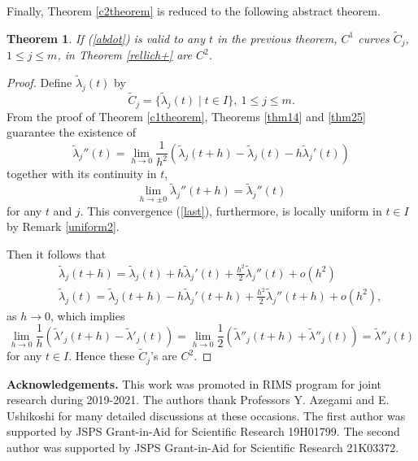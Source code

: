 \documentclass[final,a4paper]{jmsj}
\theoremstyle{thmstyleone}%
\newtheorem{theorem}{Theorem}
\theoremstyle{thmstyletwo}%
\theoremstyle{thmstylethree}%
\begin{document}
Finally, Theorem \ref{c2theorem} is reduced to the following abstract theorem. 

\begin{theorem}\label{finaltheorem} 
If (\ref{abdot}) is valid to any $t$ in the previous theorem, $C^1$ curves $\tilde C_j$, $1\leq j\leq m$, in Theorem \ref{rellich+} are $C^2$. 
\end{theorem} 
 
\begin{proof} 
Define $\tilde \lambda_j(t)$ by
\[ \tilde C_j=\{ \tilde \lambda_j(t) \mid t\in I\}, \ 1\leq j\leq m.  \]
From the proof of Theorem \ref{c1theorem}, Theorems \ref{thm14} and \ref{thm25} guarantee the existence of 
\begin{equation}   
\tilde \lambda_j''(t)=\lim_{h\rightarrow 0}\frac{1}{h^2}(\tilde \lambda_j(t+h)-\tilde \lambda_j(t)-h\tilde \lambda_j'(t)) 
 \label{last} 
\end{equation} 
together with its continuity in $t$, 
\[ \lim_{h\rightarrow \pm 0}\tilde \lambda_j''(t+h)=\tilde \lambda_j''(t) \] 
for any $t$ and $j$. This convergence (\ref{last}), furthermore, is locally uniform in $t\in I$ by Remark \ref{uniform2}. 

Then it follows that 
\begin{eqnarray*} 
& & \tilde \lambda_j(t+h)=\tilde \lambda_j(t)+h \tilde\lambda_j'(t)+\frac{h^2}{2}\tilde \lambda_j''(t)+o(h^2)  \\ 
& & \tilde \lambda_j(t)=\tilde \lambda_j(t+h)-h\tilde\lambda_j'(t+h)+\frac{h^2}{2}\tilde\lambda_j''(t+h)+o(h^2),  
\end{eqnarray*}  
as $h\rightarrow 0$, which implies   
\[  
\lim_{h\rightarrow 0}\frac{1}{h}(\tilde \lambda'_j(t+h)-\tilde \lambda'_j(t)) = \lim_{h\rightarrow 0}\frac{1}{2}(\tilde\lambda''_j(t+h)+\tilde\lambda''_j(t)) 
=\tilde \lambda''_j(t) 
\] 
for any $t\in I$. Hence these $\tilde C_j$'s are $C^2$.
\end{proof} 

\vspace{5mm} 

{\bf Acknowledgements.} This work was promoted in RIMS program for joint
research during 2019-2021. The  authors thank Professors Y. Azegami and
E. Ushikoshi for many detailed discussions at these occasions. The first
author was supported by JSPS Grant-in-Aid for Scientific Research
19H01799. The second author was supported by JSPS Grant-in-Aid for
Scientific Research 21K03372.


\end{document}

